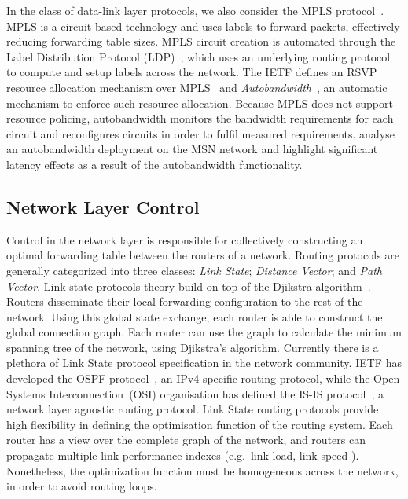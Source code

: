 In the class of data-link layer protocols, we also consider the MPLS
protocol~.  MPLS is a circuit-based technology and uses labels
to forward packets, effectively reducing forwarding table sizes.  MPLS circuit
creation is automated through the Label Distribution Protocol
(LDP)~, which uses an underlying routing protocol to compute
and setup labels across the network. The IETF defines an RSVP resource
allocation mechanism over MPLS~ and
\textit{Autobandwidth}~, an automatic mechanism to enforce
such resource allocation.  Because MPLS does not support resource policing,
autobandwidth monitors the bandwidth requirements for each circuit and
reconfigures circuits in order to fulfil measured requirements.
 analyse an autobandwidth deployment on the MSN network and
highlight significant latency effects as a result of the autobandwidth
functionality.


\subsection{Network Layer Control}

Control in the network layer is responsible for collectively constructing an optimal
forwarding table between the routers of a network.  Routing protocols are generally
categorized into three classes: \emph{Link State}; \emph{Distance Vector}; and
\emph{Path Vector}. Link state protocols theory build on-top of the Djikstra
algorithm~. Routers disseminate their local forwarding
configuration to the rest of the network.  Using this global state exchange,
each router is able to construct the global connection graph. Each router can
use the graph to calculate the minimum spanning tree of the network, using
Djikstra's algorithm.  Currently there is a plethora of Link State protocol
specification in the network community.  IETF has developed the OSPF
protocol~, an IPv4 specific routing protocol, while the Open
Systems Interconnection~(OSI) organisation has defined the IS-IS
protocol~, a network layer agnostic routing protocol.  Link
State routing protocols provide high flexibility in defining the optimisation
function of the routing system.  Each router has a view over the complete graph of
the network, and routers can propagate multiple link performance indexes
(e.g.~link load, link speed ).  Nonetheless, the optimization function must be
homogeneous across the network, in order to avoid routing loops.

